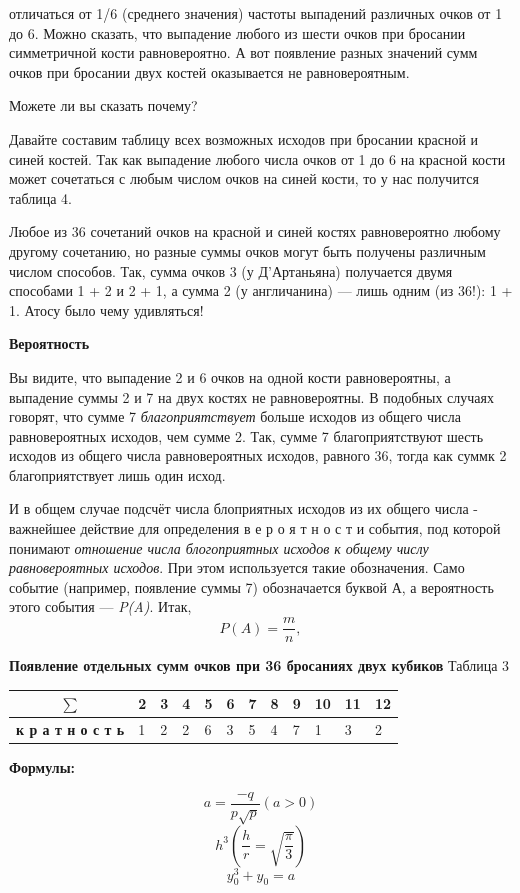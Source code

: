 \begin{multicols}{2}
\noindent
отличаться от 1/6 (среднего значения) частоты выпадений различных очков от 1 до 6. Можно сказать, что выпадение любого из шести очков при бросании симметричной кости равновероятно. А вот появление разных значений сумм очков при бросании двух костей оказывается не равновероятным.

\noindent
Можете ли вы сказать почему?

\noindent
Давайте составим таблицу всех возможных исходов при бросании красной и синей костей. Так как выпадение любого числа очков от 1 до 6 на красной кости может сочетаться с любым числом очков на синей кости, то у нас получится таблица 4.

\noindent
Любое из 36 сочетаний очков на красной и синей костях равновероятно любому другому сочетанию, но разные суммы очков могут быть получены различным числом способов. Так, сумма очков 3 (у Д'Артаньяна) получается двумя способами 1 + 2 и 2 + 1, а сумма 2 (у англичанина) --- лишь одним (из 36!): 1 + 1. Атосу было чему удивляться!

\noindent
{\bf Вероятность}

\noindent
Вы видите, что выпадение 2 и 6 очков на одной кости равновероятны, а выпадение суммы 2 и 7 на двух костях не равновероятны. В подобных случаях говорят, что сумме 7 {\it благоприятствует} больше исходов из общего числа равновероятных исходов, чем сумме 2. Так, сумме 7 благоприятствуют шесть исходов из общего числа равновероятных исходов, равного 36, тогда как суммк 2 благоприятствует лишь один исход.

\noindent
И в общем случае подсчёт числа блоприятных исходов из их общего числа - важнейшее действие для определения в е р о я т н о с т и события, под которой понимают {\it отношение числа блогоприятных исходов к общему числу равновероятных исходов}. При этом используется такие обозначения. Само событие (например, появление суммы 7) обозначается буквой А, а вероятность этого события --- {\it P(A)}. Итак,
\begin{equation*}
P(A)=\frac{m}{n},
\end{equation*}
\end{multicols}
\vspace{3cm}
{\bf Появление отдельных сумм очков при 36 бросаниях двух кубиков} Таблица 3
\begin{center}
\begin{tabularx}{\textwidth}{| c | X | X | X | X | X | X | X | X | X | X | X |}
\hline
$\sum$ & 2 & 3 & 4 & 5 & 6 & 7 & 8 & 9 & 10 & 11 & 12 \\ \hline
{\bf к р а т н о с т ь} & 1 & 2 & 2 & 6 & 3 & 5 & 4 & 7 & 1 & 3 & 2 \\ \hline
\end{tabularx}

{\bf Формулы:}
\end{center}
\begin{equation*}a=\frac{-q}{p\sqrt{p}} (a>0)\end{equation*}
\begin{equation*}h^{3}(\frac{h}{r}=\sqrt{\frac{\pi}{3}})\end{equation*}
\begin{equation*}y^{3}_{0}+y_{0}=a\end{equation*}